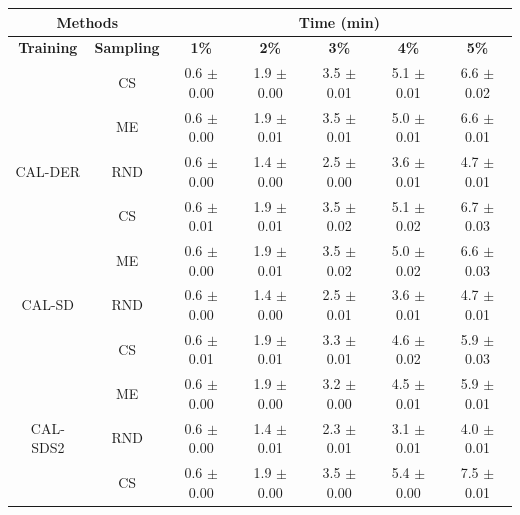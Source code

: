 \begin{table}[htbp]
\centering

\begin{tabular*}{\linewidth}{c|c|@{\extracolsep{\fill}}ccccc}
\toprule
\multicolumn{2}{c|}{\textbf{Methods}} & \multicolumn{5}{c}{\textbf{Time (min)}} \\
\midrule
\textbf{Training} & \textbf{Sampling} & \textbf{1\%} & \textbf{2\%} & \textbf{3\%} & \textbf{4\%} & \textbf{5\%}\\
\midrule
 & CS & 0.6 $\pm$ {\small 0.00} & 1.9 $\pm$ {\small 0.00} & 3.5 $\pm$ {\small 0.01} & 5.1 $\pm$ {\small 0.01} & 6.6 $\pm$ {\small 0.02}\\

 & ME & 0.6 $\pm$ {\small 0.00} & 1.9 $\pm$ {\small 0.01} & 3.5 $\pm$ {\small 0.01} & 5.0 $\pm$ {\small 0.01} & 6.6 $\pm$ {\small 0.01}\\

\multirow{-3}{*}{\raggedright\arraybackslash CAL-DER} & RND & 0.6 $\pm$ {\small 0.00} & 1.4 $\pm$ {\small 0.00} & 2.5 $\pm$ {\small 0.00} & 3.6 $\pm$ {\small 0.01} & 4.7 $\pm$ {\small 0.01}\\
\midrule
 & CS & 0.6 $\pm$ {\small 0.01} & 1.9 $\pm$ {\small 0.01} & 3.5 $\pm$ {\small 0.02} & 5.1 $\pm$ {\small 0.02} & 6.7 $\pm$ {\small 0.03}\\

 & ME & 0.6 $\pm$ {\small 0.00} & 1.9 $\pm$ {\small 0.01} & 3.5 $\pm$ {\small 0.02} & 5.0 $\pm$ {\small 0.02} & 6.6 $\pm$ {\small 0.03}\\

\multirow{-3}{*}{\raggedright\arraybackslash CAL-SD} & RND & 0.6 $\pm$ {\small 0.00} & 1.4 $\pm$ {\small 0.00} & 2.5 $\pm$ {\small 0.01} & 3.6 $\pm$ {\small 0.01} & 4.7 $\pm$ {\small 0.01}\\
\midrule
 & CS & 0.6 $\pm$ {\small 0.01} & 1.9 $\pm$ {\small 0.01} & 3.3 $\pm$ {\small 0.01} & 4.6 $\pm$ {\small 0.02} & 5.9 $\pm$ {\small 0.03}\\

 & ME & 0.6 $\pm$ {\small 0.00} & 1.9 $\pm$ {\small 0.00} & 3.2 $\pm$ {\small 0.00} & 4.5 $\pm$ {\small 0.01} & 5.9 $\pm$ {\small 0.01}\\

\multirow{-3}{*}{\raggedright\arraybackslash CAL-SDS2} & RND & 0.6 $\pm$ {\small 0.00} & 1.4 $\pm$ {\small 0.01} & 2.3 $\pm$ {\small 0.01} & 3.1 $\pm$ {\small 0.01} & 4.0 $\pm$ {\small 0.01}\\
\midrule
 & CS & 0.6 $\pm$ {\small 0.00} & 1.9 $\pm$ {\small 0.00} & 3.5 $\pm$ {\small 0.00} & 5.4 $\pm$ {\small 0.00} & 7.5 $\pm$ {\small 0.01}\\


\end{tabular*}
\end{table}

